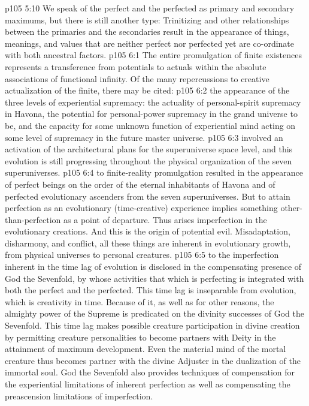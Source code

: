 \vs p105 5:10 We speak of the perfect and the perfected as primary and secondary maximums, but there is still another type: Trinitizing and other relationships between the primaries and the secondaries result in the appearance of  things, meanings, and values that are neither perfect nor perfected yet are co\hyp{}ordinate with both ancestral factors.
\vs p105 6:1 The entire promulgation of finite existences represents a transference from potentials to actuals within the absolute associations of functional infinity. Of the many repercussions to creative actualization of the finite, there may be cited:
\vs p105 6:2 \bibnobreakspace {} the appearance of the three levels of experiential supremacy: the actuality of personal\hyp{}spirit supremacy in Havona, the potential for personal\hyp{}power supremacy in the grand universe to be, and the capacity for some unknown function of experiential mind acting on some level of supremacy in the future master universe.
\vs p105 6:3 \bibnobreakspace {} involved an activation of the architectural plans for the superuniverse space level, and this evolution is still progressing throughout the physical organization of the seven superuniverses.
\vs p105 6:4 \bibnobreakspace {} to finite\hyp{}reality promulgation resulted in the appearance of perfect beings on the order of the eternal inhabitants of Havona and of perfected evolutionary ascenders from the seven superuniverses. But to attain perfection as an evolutionary (time\hyp{}creative) experience implies something other\hyp{}than\hyp{}perfection as a point of departure. Thus arises imperfection in the evolutionary creations. And this is the origin of potential evil. Misadaptation, disharmony, and conflict, all these things are inherent in evolutionary growth, from physical universes to personal creatures.
\vs p105 6:5 \bibnobreakspace {} to the imperfection inherent in the time lag of evolution is disclosed in the compensating presence of God the Sevenfold, by whose activities that which is perfecting is integrated with both the perfect and the perfected. This time lag is inseparable from evolution, which is creativity in time. Because of it, as well as for other reasons, the almighty power of the Supreme is predicated on the divinity successes of God the Sevenfold. This time lag makes possible creature participation in divine creation by permitting creature personalities to become partners with Deity in the attainment of maximum development. Even the material mind of the mortal creature thus becomes partner with the divine Adjuster in the dualization of the immortal soul. God the Sevenfold also provides techniques of compensation for the experiential limitations of inherent perfection as well as compensating the preascension limitations of imperfection.
